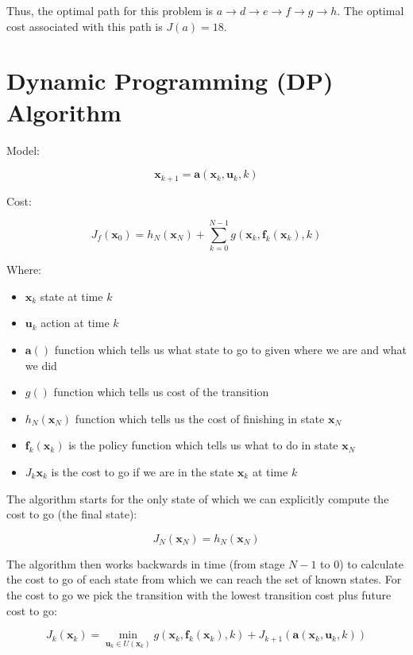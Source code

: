 \documentclass[twoside]{article}
\begin{document}
Thus, the optimal path for this problem is $a \rightarrow d \rightarrow e \rightarrow f \rightarrow g \rightarrow h$. The optimal cost associated with
this path is $J(a) = 18$.

\section{Dynamic Programming (DP) Algorithm}
Model:

$$ 
\boldsymbol{x}_{k+1}=\boldsymbol{a}\left(\boldsymbol{x}_{k}, \boldsymbol{u}_{k}, k\right)
 $$

Cost:

$$ 
J_{f}\left(\boldsymbol{x}_{0}\right)=h_{N}\left(\boldsymbol{x}_{N}\right)+\sum_{k=0}^{N-1} g\left(\boldsymbol{x}_{k}, \boldsymbol{f}_{k}\left(\boldsymbol{x}_{k}\right), k\right)
 $$

Where:
\begin{itemize}
    \item $\boldsymbol{x}_k$ state at time $k$
    \item $\boldsymbol{u}_k$ action at time $k$
    \item $\boldsymbol{a}()$ function which tells us what state to go to given where we are and what we did
    \item $g()$ function which tells us cost of the transition
    \item $h_N(\boldsymbol{x}_N)$ function which tells us the cost of finishing in state $\boldsymbol{x}_N$
    \item $\boldsymbol{f}_k(\boldsymbol{x}_k)$ is the policy function which tells us what to do in state $\boldsymbol{x}_N$
    \item $J_k\boldsymbol{x}_k$ is the cost to go if we are in the state $\boldsymbol{x}_k$ at time $k$
\end{itemize}

The algorithm starts for the only state of which we can explicitly compute the cost to go (the final state):

$$ 
J_{N}\left(\boldsymbol{x}_{N}\right)=h_{N}\left(\boldsymbol{x}_{N}\right)
 $$

The algorithm then works backwards in time (from stage $N-1$ to $0$) to calculate the cost to go of each state from which we can reach the set of known states. For the cost to go we pick the transition with the lowest transition cost plus future cost to go:

$$ 
J_{k}\left(\boldsymbol{x}_{k}\right)=\min _{\boldsymbol{u}_{k} \in U\left(\boldsymbol{x}_{k}\right)} g\left(\boldsymbol{x}_{k}, \boldsymbol{f}_{k}\left(\boldsymbol{x}_{k}\right), k\right)+J_{k+1}\left(\boldsymbol{a}\left(\boldsymbol{x}_{k}, \boldsymbol{u}_{k}, k\right)\right)
 $$
 
\end{document}
